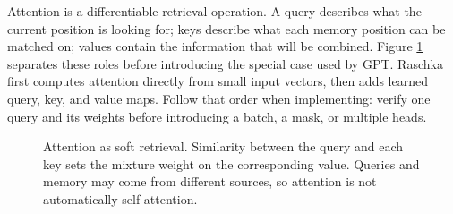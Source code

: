 \documentclass[11pt]{article}
\newcommand{\softmax}{\operatorname{softmax}}
\begin{document}
Attention is a differentiable retrieval operation. A query describes what the
current position is looking for; keys describe what each memory position can be
matched on; values contain the information that will be combined. Figure
\ref{fig:attention-retrieval} separates these roles before introducing the
special case used by GPT.
Raschka first computes attention directly from small input vectors, then adds
learned query, key, and value maps. Follow that order when implementing: verify
one query and its weights before introducing a batch, a mask, or multiple heads.

\begin{figure}[H]
\centering
{}
\caption{Attention as soft retrieval. Similarity between the query and each key
sets the mixture weight on the corresponding value. Queries and memory may come
from different sources, so attention is not automatically self-attention.}
\label{fig:attention-retrieval}
\end{figure}
\end{document}
